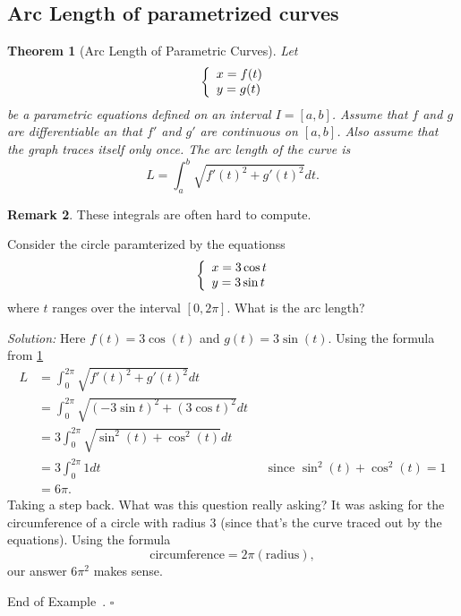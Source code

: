 \documentclass[10pt]{article}
\newtheorem{theorem}{Theorem}
\theoremstyle{definition}
\newtheorem{remark}[theorem]{Remark}
\newtheorem{example}[theorem]{Example}
\renewenvironment{example}
{\begin{oldexample}}
  {\par\smallskip\hfill   End of Example~\theexample. $\square$    \par\end{oldexample}}
\newcommand{\1}[1]{\textbf{1}_{\left[#1\right]}} %
\begin{document}
\begin{max-comment}
  \subsection{Arc Length of parametrized curves}
  \begin{theorem}[Arc Length of Parametric Curves]
    \label{thm:arc-length-parametric-curves}
    Let
    \begin{equation*}
      \left\{ \begin{array}{l@{}l} x=f(t) \\ y=g(t) \end{array}\right.
    \end{equation*}
    be a parametric equations defined on an interval $I=[a,b]$. Assume that
    $f$ and $g$ are differentiable an that $f'$ and $g'$ are continuous on
    $[a,b]$. Also assume that the graph traces itself only once. The arc
    length of the curve is
    \begin{equation*}
      L = \int_{a}^{b}\sqrt{f'(t)^{2}+g'(t)^{2}}dt. 
    \end{equation*}
  \end{theorem}
  \begin{remark}
    These integrals are often hard to compute.
  \end{remark}

  \begin{example}[Arc length of a circle]
    \label{ex:arc-length-circle}

    Consider the circle paramterized by the equationss
    \begin{equation*}
      \left\{ \begin{array}{l@{}l} x=3\cos t \\ y = 3\sin t \end{array}\right.
    \end{equation*}
    where $t$ ranges over the interval $[0,2\pi]$. What is the arc length?

    \textit{Solution:} Here $f(t) = 3\cos(t)$ and $g(t) = 3\sin(t)$. Using the
    formula from \cref{thm:arc-length-parametric-curves}
    \begin{align*}
      L 
      &= \int_{0}^{2\pi} \sqrt{f'(t)^{2}+g'(t)^{2}}dt\\
      &= \int_{0}^{2\pi} \sqrt{(-3\sin t)^{2}+(3\cos t)^{2}}dt\\
      &= 3 \int_{0}^{2\pi} \sqrt{\sin^{2}(t)+\cos^{2}(t)}dt\\ 
      &= 3 \int_{0}^{2\pi} 1 dt &&\text{since $\sin^{2}(t)+\cos^{2}(t) =1$}\\ 
      &= 6\pi.
    \end{align*}
    Taking a step back. What was this question really asking? It was asking
    for the circumference of a circle with radius $3$ (since that's the curve
    traced out by the equations). Using the formula
    \begin{equation*}
      \text{circumference} = 2\pi (\text{radius}),
    \end{equation*}
    our answer $6\pi^{2}$ makes sense.
  \end{example}


\end{max-comment}
\end{document}
